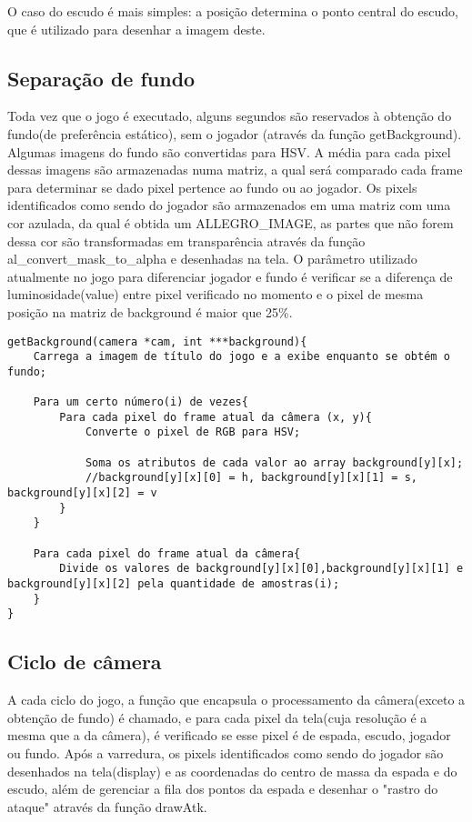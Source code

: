 \documentclass[12pt]{article}
\begin{document}
O caso do escudo é mais simples: a posição determina o ponto central do escudo, que é utilizado para desenhar a imagem deste.

\subsection{Separação de fundo}
Toda vez que o jogo é executado, alguns segundos são reservados à obtenção do fundo(de preferência estático), sem o jogador (através da função getBackground). Algumas imagens do fundo são convertidas para HSV. A média para cada pixel dessas imagens são armazenadas numa matriz, a qual será comparado cada frame para determinar se dado pixel pertence ao fundo ou ao jogador. Os pixels identificados como sendo do jogador são armazenados em uma matriz com uma cor azulada, da qual é obtida um ALLEGRO\_IMAGE, as partes que não forem dessa cor são transformadas em transparência através da função al\_convert\_mask\_to\_alpha e desenhadas na tela. O parâmetro utilizado atualmente no jogo para diferenciar jogador e fundo é verificar se a diferença de luminosidade(value) entre pixel verificado no momento e o pixel de mesma posição na matriz de background é maior que 25\%.

\begin{lstlisting}
getBackground(camera *cam, int ***background){
    Carrega a imagem de título do jogo e a exibe enquanto se obtém o fundo;
    
    Para um certo número(i) de vezes{
        Para cada pixel do frame atual da câmera (x, y){
            Converte o pixel de RGB para HSV;
            
            Soma os atributos de cada valor ao array background[y][x];
            //background[y][x][0] = h, background[y][x][1] = s, background[y][x][2] = v
        }
    }
    
    Para cada pixel do frame atual da câmera{
        Divide os valores de background[y][x][0],background[y][x][1] e background[y][x][2] pela quantidade de amostras(i);
    }
}
\end{lstlisting}

\subsection{Ciclo de câmera}
A cada ciclo do jogo, a função que encapsula o processamento da câmera(exceto a obtenção de fundo) é chamado, e para cada pixel da tela(cuja resolução é a mesma que a da câmera), é verificado se esse pixel é de espada, escudo, jogador ou fundo. Após a varredura, os pixels identificados como sendo do jogador são desenhados na tela(display) e as coordenadas do centro de massa da espada e do escudo, além de gerenciar a fila dos pontos da espada e desenhar o "rastro do ataque" através da função drawAtk.
\end{document}
